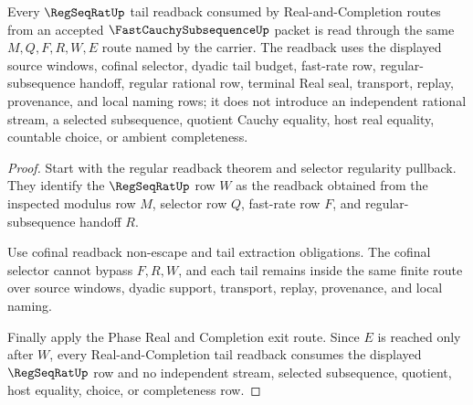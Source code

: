 \begin{theorem}
\label{thm:fast-cauchy-subsequence-regseqrat-tail-readback}
Every $\RegSeqRatUp$ tail readback consumed by Real-and-Completion routes from an accepted $\FastCauchySubsequenceUp$ packet is read through the same $M,Q,F,R,W,E$ route named by the carrier. The readback uses the displayed source windows, cofinal selector, dyadic tail budget, fast-rate row, regular-subsequence handoff, regular rational row, terminal Real seal, transport, replay, provenance, and local naming rows; it does not introduce an independent rational stream, a selected subsequence, quotient Cauchy equality, host real equality, countable choice, or ambient completeness.
\end{theorem}
\begin{proof}
Start with the regular readback theorem and selector regularity pullback. They identify the $\RegSeqRatUp$ row $W$ as the readback obtained from the inspected modulus row $M$, selector row $Q$, fast-rate row $F$, and regular-subsequence handoff $R$.

Use cofinal readback non-escape and tail extraction obligations. The cofinal selector cannot bypass $F,R,W$, and each tail remains inside the same finite route over source windows, dyadic support, transport, replay, provenance, and local naming.

Finally apply the Phase Real and Completion exit route. Since $E$ is reached only after $W$, every Real-and-Completion tail readback consumes the displayed $\RegSeqRatUp$ row and no independent stream, selected subsequence, quotient, host equality, choice, or completeness row.
\end{proof}


